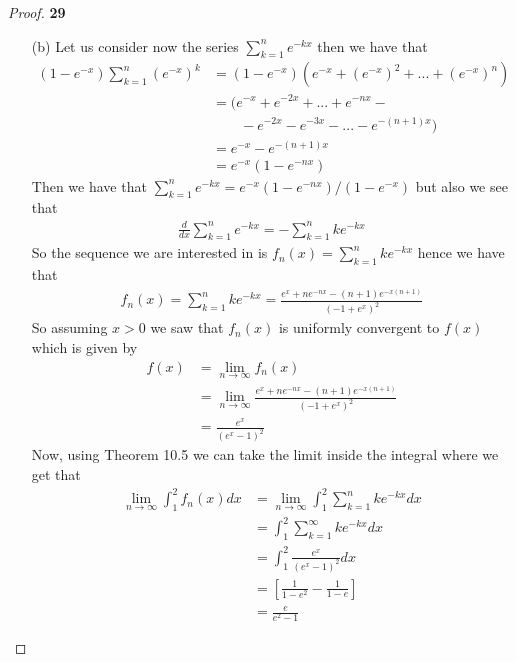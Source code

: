 \documentclass[11pt]{article}
\theoremstyle{definition}
\begin{document}
\begin{proof}{\textbf{29}}
\begin{itemize}
    \item [(b)] Let us consider now the series $\sum_{k=1}^n e^{-kx}$
    then we have that
    \begin{align*}
        (1 - e^{-x})\sum_{k=1}^n (e^{-x})^k
        &= (1 - e^{-x})(e^{-x} + (e^{-x})^2 + ... + (e^{-x})^n)\\
        &= (e^{-x} + e^{-2x} + ... + e^{-nx} - \\
        &\qquad- e^{-2x} - e^{-3x} -... -e^{-(n+1)x})\\
        &= e^{-x} - e^{-(n+1)x}\\
        &= e^{-x}(1 - e^{-nx})
    \end{align*}
    Then we have that $\sum_{k=1}^n e^{-kx} = e^{-x}(1 - e^{-nx})/(1 - e^{-x})$
    but also we see that
    \begin{align*}
        \frac{d}{dx}\sum_{k=1}^n e^{-kx} = -\sum_{k=1}^n ke^{-kx}
    \end{align*}
    So the sequence we are interested in is $f_n(x) = \sum_{k=1}^n ke^{-kx}$
    hence we have that
    \begin{align*}
        f_n(x) = \sum_{k=1}^n ke^{-kx} = 
        \frac{e^{x} + ne^{-n x} - (n + 1)e^{-x(n +1)}}{(-1 + e^x)^2}
    \end{align*}
    So assuming $x > 0$ we saw that $f_n(x)$ is uniformly convergent to
    $f(x)$ which is given by
    \begin{align*}
        f(x) &= \lim_{n\to\infty} f_n(x)\\
        &= \lim_{n\to\infty} \frac{e^{x} + ne^{-n x} - (n + 1)e^{-x(n +1)}}{(-1 + e^x)^2}\\
        &=\frac{e^{x}}{(e^x - 1)^2}
    \end{align*}
    Now, using Theorem 10.5 we can take the limit inside the integral
    where we get that
    \begin{align*}
        \lim_{n \to \infty}\int_{1}^2 f_n(x) dx &=
        \lim_{n \to \infty}\int_{1}^2 \sum_{k=1}^n ke^{-kx} dx\\
        &= \int_{1}^2 \sum_{k=1}^\infty ke^{-kx} dx\\
        &= \int_1^2 \frac{e^{x}}{(e^x - 1)^2} dx\\
        &= \left[\frac{1}{1 - e^2} - \frac{1}{1 - e}\right]\\
        &= \frac{e}{e^2 - 1}
    \end{align*}
\end{itemize}
\end{proof}
\end{document}
